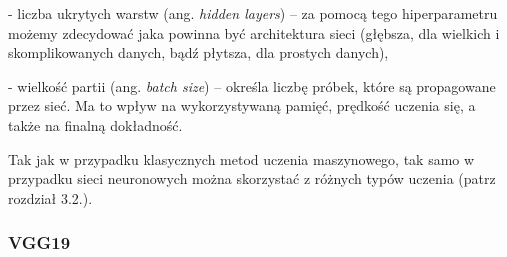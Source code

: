 - liczba ukrytych warstw (ang. \textit{hidden layers}) – za pomocą tego hiperparametru możemy zdecydować jaka powinna być architektura sieci (głębsza, dla wielkich i skomplikowanych danych, bądź płytsza, dla prostych danych),

- wielkość partii (ang. \textit{batch size}) – określa liczbę próbek, które są propagowane przez sieć. Ma to wpływ na wykorzystywaną pamięć, prędkość uczenia się, a także na finalną dokładność. 

\noindent Tak jak w przypadku klasycznych metod uczenia maszynowego, tak samo w przypadku sieci neuronowych można skorzystać z różnych typów uczenia (patrz rozdział 3.2.). 

\subsubsection{VGG19}
\label{cha:VGG19}



































































